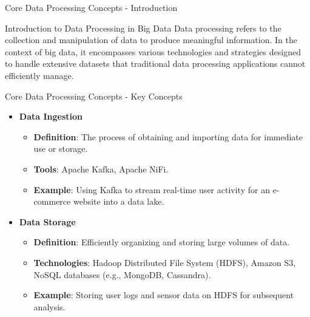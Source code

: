 \documentclass[aspectratio=169]{beamer}
\begin{document}
\begin{frame}[fragile]{Core Data Processing Concepts - Introduction}
    \begin{block}{Introduction to Data Processing in Big Data}
        Data processing refers to the collection and manipulation of data to produce meaningful information. In the context of big data, it encompasses various technologies and strategies designed to handle extensive datasets that traditional data processing applications cannot efficiently manage.
    \end{block}
\end{frame}

\begin{frame}[fragile]{Core Data Processing Concepts - Key Concepts}
    \begin{itemize}
        \item \textbf{Data Ingestion}
            \begin{itemize}
                \item \textbf{Definition}: The process of obtaining and importing data for immediate use or storage.
                \item \textbf{Tools}: Apache Kafka, Apache NiFi.
                \item \textbf{Example}: Using Kafka to stream real-time user activity for an e-commerce website into a data lake.
            \end{itemize}

        \item \textbf{Data Storage}
            \begin{itemize}
                \item \textbf{Definition}: Efficiently organizing and storing large volumes of data.
                \item \textbf{Technologies}: Hadoop Distributed File System (HDFS), Amazon S3, NoSQL databases (e.g., MongoDB, Cassandra).
                \item \textbf{Example}: Storing user logs and sensor data on HDFS for subsequent analysis.
            \end{itemize}
    \end{itemize}
\end{frame}
\end{document}
